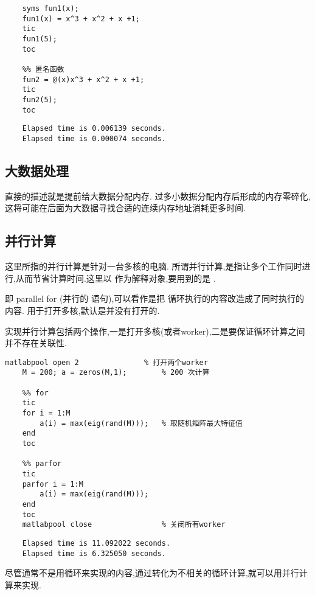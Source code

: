   \vspace{-0.8cm}
  \begin{lstlisting}[caption = 不同函数类型效率对比]
    %% 符号函数
    syms fun1(x);
    fun1(x) = x^3 + x^2 + x +1;
    tic
    fun1(5);
    toc

    %% 匿名函数
    fun2 = @(x)x^3 + x^2 + x +1;
    tic
    fun2(5);
    toc
  \end{lstlisting}

  \vspace{-0.8cm}
  \begin{lstlisting}
    Elapsed time is 0.006139 seconds.
    Elapsed time is 0.000074 seconds.
  \end{lstlisting}



\subsection{大数据处理}
 直接的描述就是提前给大数据分配内存. 过多小数据分配内存后形成的内存零碎化,这将可能在后面为大数据寻找合适的连续内存地址消耗更多时间.



\subsection{并行计算}
 这里所指的并行计算是针对一台多核的电脑.
 所谓并行计算,是指让多个工作同时进行,从而节省计算时间.这里以  作为解释对象,要用到的是 .\par
  即 parallel for (并行的  语句),可以看作是把  循环执行的内容改造成了同时执行的内容.  用于打开多核,默认是并没有打开的.\par
 实现并行计算包括两个操作,一是打开多核(或者worker),二是要保证循环计算之间并不存在关联性.

  \vspace{-0.8cm}
  \begin{lstlisting}[caption = 并行计算parfor与for效率对比]
    matlabpool open 2               % 打开两个worker
    M = 200; a = zeros(M,1);        % 200 次计算

    %% for
    tic  
    for i = 1:M        
        a(i) = max(eig(rand(M)));   % 取随机矩阵最大特征值
    end 
    toc
    
    %% parfor
    tic  
    parfor i = 1:M 
        a(i) = max(eig(rand(M))); 
    end 
    toc
    matlabpool close                % 关闭所有worker
  \end{lstlisting}

  \vspace{-0.8cm}
  \begin{lstlisting}
    Elapsed time is 11.092022 seconds.
    Elapsed time is 6.325050 seconds.
  \end{lstlisting}

尽管通常不是用循环来实现的内容,通过转化为不相关的循环计算,就可以用并行计算来实现.




